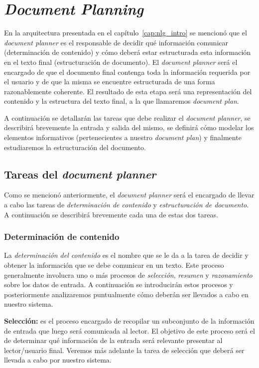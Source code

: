 \chapter{\textit{Document Planning}}
\label{cap:document_planning}

En la arquitectura presentada en el capítulo~\ref{cap:nlg_intro} se mencionó que el \emph{document planner} es el responsable de decidir qué información comunicar (determinación de contenido) y cómo deberá estar estructurada esta información en el texto final (estructuración de documento). El \textit{document planner} será el encargado de que el documento final contenga toda la información requerida por el usuario y de que la misma se encuentre estructurada de una forma razonablemente coherente. El resultado de esta etapa será una representación del contenido y la estructura del texto final, a la que llamaremos \emph{document plan}.

A continuación se detallarán las tareas que debe realizar el \textit{document planner}, se describirá brevemente la entrada y salida del mismo, se definirá cómo modelar los elementos informativos (pertenecientes a nuestro \emph{document plan}) y finalmente estudiaremos la estructuración del documento.

\section{Tareas del \textit{document planner}}
Como se mencionó anteriormente, el \textit{document planner} será el encargado de llevar a cabo las tareas de \emph{determinación de contenido} y \emph{estructuración de documento}. A continuación se describirá brevemente cada una de estas dos tareas.

\subsection*{Determinación de contenido}

La \emph{determinación del contenido} es el nombre que se le da a la tarea de decidir y obtener la información que se debe comunicar en un texto. Este proceso generalmente involucra uno o más procesos de \emph{selección}, \emph{resumen} y \emph{razonamiento} sobre los datos de entrada. A continuación se introducirán estos procesos y posteriormente analizaremos puntualmente cómo deberán ser llevados a cabo en nuestro sistema.

\bigskip
\noindent
\textbf{Selección:} es el proceso encargado de recopilar un subconjunto de la información de entrada que luego será comunicada al lector. El objetivo de este proceso será el de determinar qué información de la entrada será relevante presentar al lector/usuario final. Veremos más adelante la tarea de selección que deberá ser llevada a cabo por nuestro sistema.


